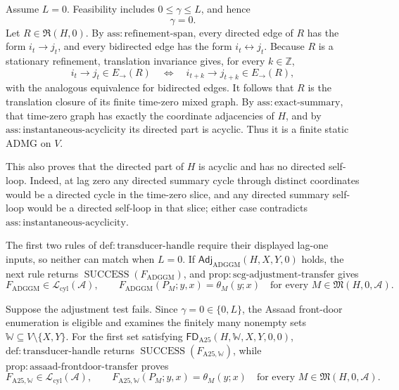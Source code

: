 Assume \(L=0\).  Feasibility includes \(0\leq\gamma\leq L\), and hence
\[
\gamma=0.
\]
Let \(R\in\mathfrak R(H,0)\).  By \(\mathrm{ass:refinement\text{-}span}\), every directed edge of \(R\) has the form \(i_t\to j_t\), and every bidirected edge has the form \(i_t\leftrightarrow j_t\).  Because \(R\) is a stationary refinement, translation invariance gives, for every \(k\in\mathbb Z\),
\[
i_t\to j_t\in E_{\to}(R)
\quad\Longleftrightarrow\quad
i_{t+k}\to j_{t+k}\in E_{\to}(R),
\]
with the analogous equivalence for bidirected edges.  It follows that \(R\) is the translation closure of its finite time-zero mixed graph.  By \(\mathrm{ass:exact\text{-}summary}\), that time-zero graph has exactly the coordinate adjacencies of \(H\), and by \(\mathrm{ass:instantaneous\text{-}acyclicity}\) its directed part is acyclic.  Thus it is a finite static ADMG on \(V\).

This also proves that the directed part of \(H\) is acyclic and has no directed self-loop.  Indeed, at lag zero any directed summary cycle through distinct coordinates would be a directed cycle in the time-zero slice, and any directed summary self-loop would be a directed self-loop in that slice; either case contradicts \(\mathrm{ass:instantaneous\text{-}acyclicity}\).

The first two rules of \(\mathrm{def:transducer\text{-}handle}\) require their displayed lag-one inputs, so neither can match when \(L=0\).  If \(\mathsf{Adj}_{\mathrm{ADGGM}}(H,X,Y,0)\) holds, the next rule returns \(\operatorname{SUCCESS}(F_{\mathrm{ADGGM}})\), and \(\mathrm{prop:scg\text{-}adjustment\text{-}transfer}\) gives
\[
F_{\mathrm{ADGGM}}\in\mathcal L_{\mathrm{cyl}}(\mathcal A),
\qquad
F_{\mathrm{ADGGM}}(P_M;y,x)=\theta_M(y;x)
\quad
\text{for every }M\in\mathfrak M(H,0,\mathcal A).
\]

Suppose the adjustment test fails.  Since \(\gamma=0\in\{0,L\}\), the Assaad front-door enumeration is eligible and examines the finitely many nonempty sets \(\mathbb W\subseteq V\setminus\{X,Y\}\).  For the first set satisfying \(\mathsf{FD}_{\mathrm{A25}}(H,\mathbb W,X,Y,0,0)\), \(\mathrm{def:transducer\text{-}handle}\) returns \(\operatorname{SUCCESS}(F_{\mathrm{A25},\mathbb W})\), while \(\mathrm{prop:assaad\text{-}frontdoor\text{-}transfer}\) proves
\[
F_{\mathrm{A25},\mathbb W}\in\mathcal L_{\mathrm{cyl}}(\mathcal A),
\qquad
F_{\mathrm{A25},\mathbb W}(P_M;y,x)=\theta_M(y;x)
\quad
\text{for every }M\in\mathfrak M(H,0,\mathcal A).
\]

